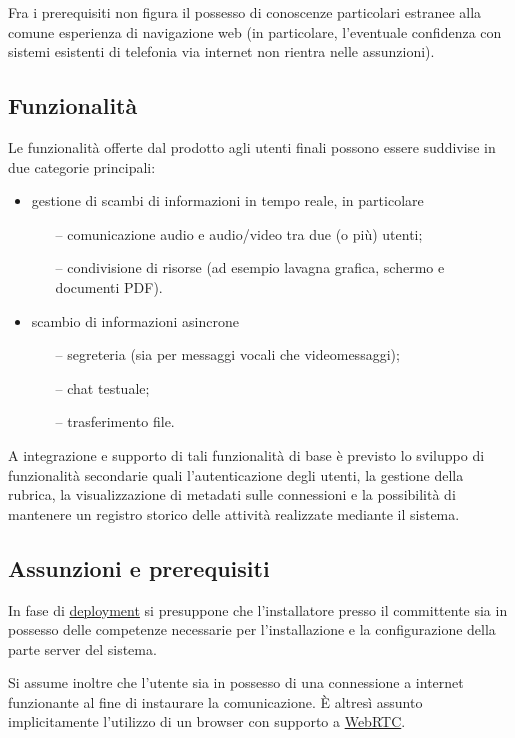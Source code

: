 Fra i prerequisiti non figura il possesso di conoscenze particolari estranee alla comune esperienza di navigazione web (in particolare, l'eventuale confidenza con sistemi esistenti di telefonia via internet non rientra nelle assunzioni).

\subsection{Funzionalità}
Le funzionalità offerte dal prodotto agli utenti finali possono essere suddivise in due categorie principali:
\begin{itemize}
  \item gestione di scambi di informazioni in tempo reale, in particolare
  \begin{itemize}
  \item[--] comunicazione audio e audio/video tra due (o più) utenti;
  \item[--] condivisione di risorse (ad esempio lavagna grafica, schermo e documenti PDF). 
  \end{itemize}
  \item scambio di informazioni asincrone 
  \begin{itemize}
  \item[--] segreteria (sia per messaggi vocali che videomessaggi);
  \item[--] chat testuale;
  \item[--] trasferimento file.
  \end{itemize}
\end{itemize}

A integrazione e supporto di tali funzionalità di base è previsto lo sviluppo di funzionalità secondarie quali l'autenticazione degli utenti, la gestione della rubrica, la visualizzazione di metadati sulle connessioni e la possibilità di mantenere un registro storico delle attività realizzate mediante il sistema.

\subsection{Assunzioni e prerequisiti}
In fase di \underline{deployment} si presuppone che l'installatore presso il committente sia in possesso delle competenze necessarie per l'installazione e la configurazione della parte server del sistema.

Si assume inoltre che l'utente sia in possesso di una connessione a internet funzionante al fine di instaurare la comunicazione. È altresì assunto implicitamente l'utilizzo di un browser con supporto a \underline{WebRTC}.

\clearpage




